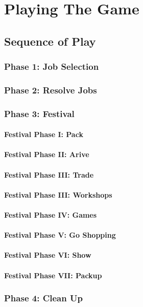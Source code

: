 \chapter{Playing The Game}
\section{Sequence of Play}
\subsection{Phase 1: Job Selection}
\subsection{Phase 2: Resolve Jobs}
\subsection{Phase 3: Festival}
\subsubsection{Festival Phase I: Pack}
\subsubsection{Festival Phase II: Arive}
\subsubsection{Festival Phase III: Trade}
\subsubsection{Festival Phase III: Workshops}
\subsubsection{Festival Phase IV: Games}
\subsubsection{Festival Phase V: Go Shopping}
\subsubsection{Festival Phase VI: Show}
\subsubsection{Festival Phase VII: Packup}
\subsection{Phase 4: Clean Up}